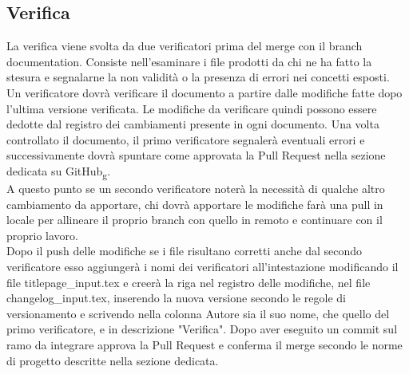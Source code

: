 \subsection{Verifica}
La verifica viene svolta da due verificatori prima del merge con il branch documentation.
Consiste nell'esaminare i file prodotti da chi ne ha fatto la stesura e segnalarne la non validità o 
la presenza di errori nei concetti esposti.\\
Un verificatore dovrà verificare il documento a partire dalle modifiche fatte dopo l'ultima versione verificata.
Le modifiche da verificare quindi possono essere dedotte dal registro dei cambiamenti presente in ogni documento.
Una volta controllato il documento, il primo verificatore segnalerà eventuali errori e
successivamente dovrà spuntare come approvata la Pull Request nella sezione dedicata su GitHub\textsubscript{g}. \\
A questo punto se un secondo verificatore noterà la necessità di qualche altro cambiamento da apportare, chi dovrà apportare le modifiche farà una pull in locale per
allineare il proprio branch con quello in remoto e continuare con il proprio lavoro.\\
Dopo il push delle modifiche se i file risultano corretti anche dal secondo verificatore esso aggiungerà i nomi dei verificatori all'intestazione modificando il file titlepage\_input.tex
 e creerà la riga nel registro delle modifiche, nel file changelog\_input.tex,  inserendo la nuova versione secondo le regole di versionamento e scrivendo nella colonna Autore sia il suo nome,
che quello del primo verificatore, e in descrizione "Verifica".
Dopo aver eseguito un commit sul ramo da integrare approva la Pull Request e conferma il merge secondo le norme di progetto descritte nella sezione dedicata.